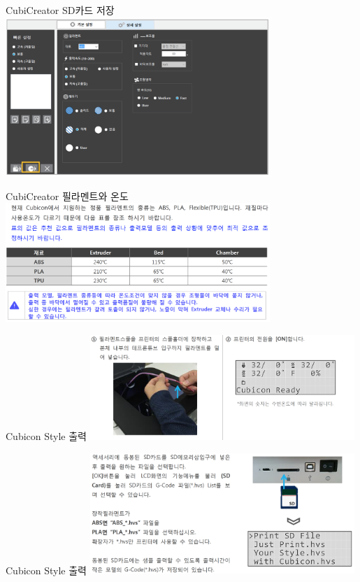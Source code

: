 \documentclass[11pt]{beamer}
\begin{document}
\begin{frame}[t]{CubiCreator SD카드 저장}\footnotesize
	\centering
	\includegraphics[width=10cm]{./image/18_33.png}
\end{frame}

\begin{frame}[t]{CubiCreator 필라멘트와 온도}\footnotesize
	\centering
	\includegraphics[width=10cm]{./image/18_34.png}
\end{frame}


\begin{frame}[t]{Cubicon Style 출력}\footnotesize
	\centering
	\includegraphics[width=10cm]{./image/18_25.png}
\end{frame}

\begin{frame}[t]{Cubicon Style 출력}\footnotesize
	\centering
	\includegraphics[width=10cm]{./image/18_26.png}
\end{frame}
\end{document}
